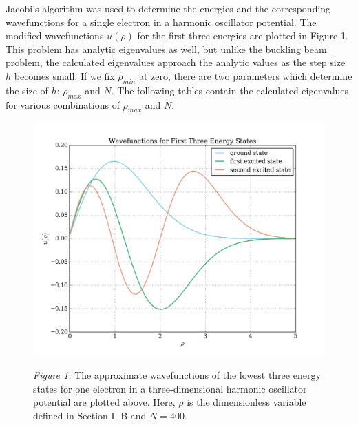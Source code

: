 \documentclass[prb,aps,twocolumn,showpacs,10pt]{revtex4-1}
\begin{document}
Jacobi's algorithm was used to determine the energies and the corresponding wavefunctions for a single electron in a harmonic oscillator potential. The modified wavefunctions $u(\rho)$ for the first three energies are plotted in Figure 1. This problem has analytic eigenvalues as well, but unlike the buckling beam problem, the calculated eigenvalues approach the analytic values as the step size $h$ becomes small. If we fix $\rho_{min}$ at zero, there are two parameters which determine the size of $h$: $\rho_{max}$ and $N$. The following tables contain the calculated eigenvalues for various combinations of $\rho_{max}$ and $N$. 
\begin{center}
\begin{figure}
\includegraphics[scale=0.7]{wvfunc_1e.pdf}

\textit{Figure 1.} The approximate wavefunctions of the lowest three energy states for one electron in a three-dimensional harmonic oscillator potential are plotted above. Here, $\rho$ is the dimensionless variable defined in Section I. B and $N=400$.
\end{figure}
\end{center}
\end{document}
